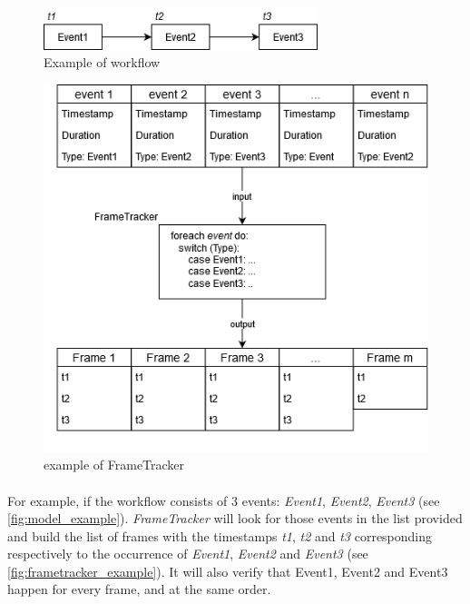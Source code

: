 \documentclass{kththesis}
\begin{document}
     \begin{figure}[h!]
        \centering
        \includegraphics[width=8cm]{kththesis/Figures/chrome_model_example.png}
        \caption{Example of workflow}
        \label{fig:model_example}
    \end{figure}
    
    \begin{figure}[h!]
        \centering
        \includegraphics[width=13cm]{kththesis/Figures/frametracker_example.png}
        \caption{example of FrameTracker}
        \label{fig:frametracker_example}
    \end{figure}
    
    
    \paragraph{}
    For example, if the workflow consists of 3 events: \textit{Event1}, \textit{Event2}, \textit{Event3} (see \autoref{fig:model_example}). \textit{FrameTracker} will look for those events in the list provided and build the list of frames with the timestamps \textit{t1}, \textit{t2} and \textit{t3} corresponding respectively to the occurrence of \textit{Event1}, \textit{Event2} and \textit{Event3} (see \autoref{fig:frametracker_example}). It will also verify that Event1, Event2 and Event3 happen for every frame, and at the same order.
    
\end{document}
